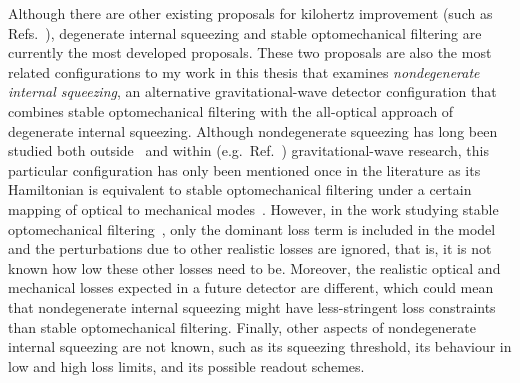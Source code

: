 Although there are other existing proposals for kilohertz improvement (such as Refs.~\cite{hu2021quantum,Ganapathy_2021}), degenerate internal squeezing and stable optomechanical filtering are currently the most developed proposals. These two proposals are also the most related configurations to my work in this thesis that examines \emph{nondegenerate internal squeezing}, an alternative gravitational-wave detector configuration that combines stable optomechanical filtering with the all-optical approach of degenerate internal squeezing. %
Although nondegenerate squeezing has long been studied both outside~\cite{Andersen_2016} and within (e.g.\ Ref.~\cite{Yap:19}) gravitational-wave research, this particular configuration has only been mentioned once in the literature as its Hamiltonian is equivalent to stable optomechanical filtering under a certain mapping of optical to mechanical modes~\cite{liBroadbandSensitivityImprovement2020}.
However, in the work studying stable optomechanical filtering~\cite{liBroadbandSensitivityImprovement2020,liEnhancingInterferometerSensitivity2021}, only the dominant loss term is included in the model and the perturbations due to other realistic losses are ignored, that is, it is not known how low these other losses need to be.
Moreover, the realistic optical and mechanical losses expected in a future detector are different, which could mean that nondegenerate internal squeezing might have less-stringent loss constraints than stable optomechanical filtering.
Finally, other aspects of nondegenerate internal squeezing are not known, such as its squeezing threshold, its behaviour in low and high loss limits, and its possible readout schemes.


